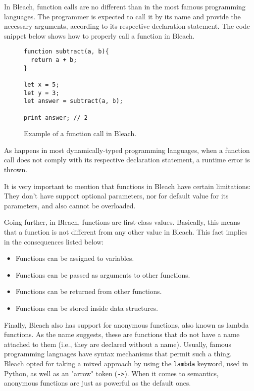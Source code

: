 In Bleach, function calls are no different than in the most famous programming languages. The programmer is expected to call it by its name and provide the necessary arguments, according to its respective declaration statement. The code snippet below shows how to properly call a function in Bleach.

\begin{figure}[H]
    \centering
    \begin{lstlisting}
function subtract(a, b){
  return a + b;
}

let x = 5;
let y = 3;
let answer = subtract(a, b);

print answer; // 2
    \end{lstlisting}
    \caption{Example of a function call in Bleach.}
\end{figure}

As happens in most dynamically-typed programming languages, when a function call does not comply with its respective declaration statement, a runtime error is thrown.

It is very important to mention that functions in Bleach have certain limitations: They don't have support optional parameters, nor for default value for its parameters, and also cannot be overloaded.

Going further, in Bleach, functions are first-class values. Basically, this means that a function is not different from any other value in Bleach. This fact implies in the consequences listed below:

\begin{itemize}
    \item Functions can be assigned to variables.
    \item Functions can be passed as arguments to other functions.
    \item Functions can be returned from other functions.
    \item Functions can be stored inside data structures.
\end{itemize}

Finally, Bleach also has support for anonymous functions, also known as lambda functions. As the name suggests, these are functions that do not have a name attached to them (i.e., they are declared without a name). Usually, famous programming languages have syntax mechanisms that permit such a thing. Bleach opted for taking a mixed approach by using the \texttt{lambda} keyword, used in Python, as well as an "arrow" token (\texttt{->}). When it comes to semantics, anonymous functions are just as powerful as the default ones.

